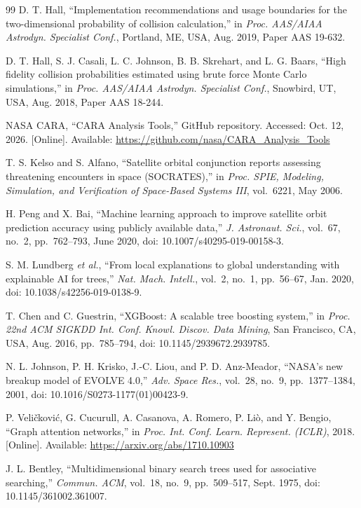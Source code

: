 \documentclass[conference]{IEEEtran}
\begin{document}
\begin{thebibliography}{99}
D. T. Hall, ``Implementation recommendations and usage boundaries for the
two-dimensional probability of collision calculation,'' in \emph{Proc.
AAS/AIAA Astrodyn. Specialist Conf.}, Portland, ME, USA, Aug. 2019,
Paper AAS 19-632.

D. T. Hall, S. J. Casali, L. C. Johnson, B. B. Skrehart, and L. G. Baars,
``High fidelity collision probabilities estimated using brute force Monte
Carlo simulations,'' in \emph{Proc. AAS/AIAA Astrodyn. Specialist Conf.},
Snowbird, UT, USA, Aug. 2018, Paper AAS 18-244.

NASA CARA, ``CARA Analysis Tools,'' GitHub repository. Accessed: Oct. 12,
2026. [Online]. Available: \url{https://github.com/nasa/CARA_Analysis_Tools}

T. S. Kelso and S. Alfano, ``Satellite orbital conjunction reports assessing
threatening encounters in space (SOCRATES),'' in \emph{Proc. SPIE, Modeling,
Simulation, and Verification of Space-Based Systems III}, vol.~6221,
May 2006.

H. Peng and X. Bai, ``Machine learning approach to improve satellite orbit
prediction accuracy using publicly available data,'' \emph{J. Astronaut.
Sci.}, vol.~67, no.~2, pp.~762--793, June 2020,
doi: 10.1007/s40295-019-00158-3.

S. M. Lundberg \emph{et al.}, ``From local explanations to global
understanding with explainable AI for trees,'' \emph{Nat. Mach. Intell.},
vol.~2, no.~1, pp.~56--67, Jan. 2020, doi: 10.1038/s42256-019-0138-9.

T. Chen and C. Guestrin, ``XGBoost: A scalable tree boosting system,'' in
\emph{Proc. 22nd ACM SIGKDD Int. Conf. Knowl. Discov. Data Mining}, San
Francisco, CA, USA, Aug. 2016, pp.~785--794, doi: 10.1145/2939672.2939785.

N. L. Johnson, P. H. Krisko, J.-C. Liou, and P. D. Anz-Meador, ``NASA's new
breakup model of EVOLVE 4.0,'' \emph{Adv. Space Res.}, vol.~28, no.~9,
pp.~1377--1384, 2001, doi: 10.1016/S0273-1177(01)00423-9.

P. Veli\v{c}kovi\'{c}, G. Cucurull, A. Casanova, A. Romero, P. Li\`{o}, and
Y. Bengio, ``Graph attention networks,'' in \emph{Proc. Int. Conf. Learn.
Represent. (ICLR)}, 2018. [Online]. Available:
\url{https://arxiv.org/abs/1710.10903}

J. L. Bentley, ``Multidimensional binary search trees used for associative
searching,'' \emph{Commun. ACM}, vol.~18, no.~9, pp.~509--517, Sept. 1975,
doi: 10.1145/361002.361007.


\end{thebibliography}
\end{document}
